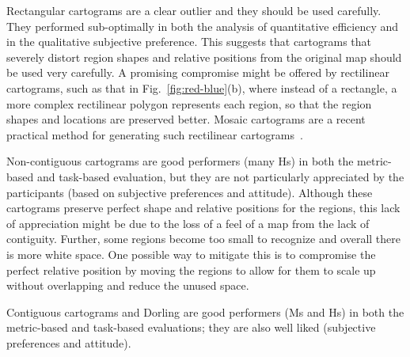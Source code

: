 \documentclass[10pt,journal,compsoc]{IEEEtran}
\begin{document}
Rectangular cartograms are a clear outlier and they should be used carefully. They performed sub-optimally in both the analysis of quantitative efficiency and in the qualitative subjective preference. This suggests that cartograms that severely distort region shapes and relative positions from the original map should be used very carefully. 
 A  promising compromise might be offered by rectilinear cartograms, such as that in Fig.~\ref{fig:red-blue}(b), where instead of a rectangle, a more complex rectilinear polygon represents each region, so that the region shapes and locations are preserved better. Mosaic cartograms are a recent practical method for generating such rectilinear cartograms~\cite{cano2015mosaic}.

Non-contiguous cartograms are good performers (many Hs) in both the metric-based and task-based evaluation, but they are not particularly appreciated by the participants (based on subjective preferences and attitude). Although these cartograms preserve perfect shape and relative positions for the regions, this lack of appreciation might be due to the loss of a feel of a map from the lack of contiguity. Further, some regions become too small to recognize and overall there is more white space. 
One possible way to mitigate this is to compromise the perfect relative position by moving the regions to allow for them to scale up without overlapping and reduce the unused space.

Contiguous cartograms and Dorling are good performers (Ms and Hs) in both the metric-based and task-based evaluations; they are also well liked (subjective preferences and attitude).







\newcommand{\plotStudyB}[1]
{
	\parbox{\textwidth}
	{
		\centering
		\texttt{[image: \#1-familiar.pdf]}
		\texttt{[image: \#1-gender.pdf]}
		\texttt{[image: \#1-education.pdf]}
		\texttt{[image: \#1-Age.pdf]}
	}
}


\newcommand{\plotStudyG}[1]
{
	\parbox{0.35\textwidth}
	{
		\hspace{-0.4cm}
		\texttt{[image: plots-split-bean/\#1-gender.pdf]}
	}
}

\newcommand{\plotStudyF}[1]
{
	\parbox{0.35\textwidth}
	{
		\hspace{-0.4cm}
		\texttt{[image: plots-split-bean/\#1-familiar.pdf]}
	}
}
\end{document}
